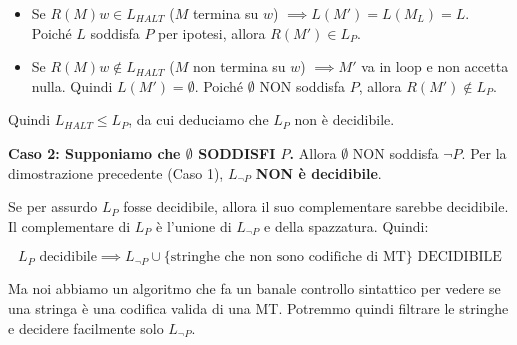 \begin{itemize}
    \item Se $R(M)w \in L_{HALT}$ ($M$ termina su $w$) $\implies L(M') = L(M_L) = L$. Poiché $L$ soddisfa $P$ per ipotesi, allora $R(M') \in L_P$.
    \item Se $R(M)w \notin L_{HALT}$ ($M$ non termina su $w$) $\implies M'$ va in loop e non accetta nulla. Quindi $L(M') = \emptyset$. Poiché $\emptyset$ NON soddisfa $P$, allora $R(M') \notin L_P$.
\end{itemize}
Quindi $L_{HALT} \le L_P$, da cui deduciamo che $L_P$ non è decidibile.

\vspace{0.4cm}
\textbf{Caso 2: Supponiamo che $\emptyset$ SODDISFI $P$.}
Allora $\emptyset$ NON soddisfa $\neg P$.
Per la dimostrazione precedente (Caso 1), $L_{\neg P}$ \textbf{NON è decidibile}.

\begin{center}
    \end{center}

\vspace{0.4cm}

Se per assurdo $L_P$ fosse decidibile, allora il suo complementare sarebbe decidibile.
Il complementare di $L_P$ è l'unione di $L_{\neg P}$ e della spazzatura. Quindi:

$$ L_P \text{ decidibile} \implies L_{\neg P} \cup \{ \text{stringhe che non sono codifiche di MT} \} \text{ DECIDIBILE} $$

Ma noi abbiamo un algoritmo che fa un banale controllo sintattico per vedere se una stringa è una codifica valida di una MT. Potremmo quindi filtrare le stringhe e decidere facilmente solo $L_{\neg P}$.


